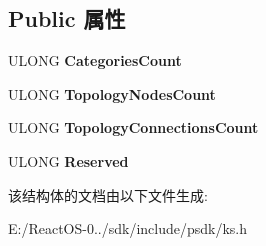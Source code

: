 \subsection*{Public 属性}
\begin{DoxyCompactItemize}
\item 
\mbox{\label{struct_k_s_t_o_p_o_l_o_g_y_a43683fc683ee214878205240774f0ae8}} 
U\+L\+O\+NG {\bfseries Categories\+Count}
\item 
\mbox{\label{struct_k_s_t_o_p_o_l_o_g_y_ac88044b4b2c511b80f071440c51841cd}} 
U\+L\+O\+NG {\bfseries Topology\+Nodes\+Count}
\item 
\mbox{\label{struct_k_s_t_o_p_o_l_o_g_y_a2061a34f2c7d5477df0d498a51962896}} 
U\+L\+O\+NG {\bfseries Topology\+Connections\+Count}
\item 
\mbox{\label{struct_k_s_t_o_p_o_l_o_g_y_a800a4e9385fc04d3a5554b6a523c16a3}} 
U\+L\+O\+NG {\bfseries Reserved}
\end{DoxyCompactItemize}


该结构体的文档由以下文件生成\+:\begin{DoxyCompactItemize}
\item 
E\+:/\+React\+O\+S-\/0../sdk/include/psdk/ks.\+h\end{DoxyCompactItemize}
